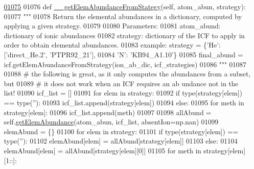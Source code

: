 \begin{DoxyCode}
\hypertarget{classpyneb_1_1core_1_1icf_1_1_i_c_f_l01075}{}\hyperlink{classpyneb_1_1core_1_1icf_1_1_i_c_f_adb36fd35be4adf2410376f184449fcdb}{01075} 
01076     \textcolor{keyword}{def }\hyperlink{classpyneb_1_1core_1_1icf_1_1_i_c_f_adb36fd35be4adf2410376f184449fcdb}{\_\_getElemAbundanceFromStategy}(self, atom\_abun, strategy):
01077         \textcolor{stringliteral}{"""}
01078 \textcolor{stringliteral}{        Return the elemental abundances in a dictionary, computed by applying a given strategy.}
01079 \textcolor{stringliteral}{        }
01080 \textcolor{stringliteral}{        Parameters:}
01081 \textcolor{stringliteral}{            atom\_abund: dictionary of ionic abundances}
01082 \textcolor{stringliteral}{            strategy: dictionary of the ICF to apply in order to obtain elemental abundances.}
01083 \textcolor{stringliteral}{                example: strategy = \{'He':['direct\_He.2', 'PTPR92\_21'], }
01084 \textcolor{stringliteral}{                                   'N': 'KB94\_A1.10'\}}
01085 \textcolor{stringliteral}{            final\_abund = icf.getElemAbundanceFromStrategy(ion\_ab\_dic, icf\_strategies)}
01086 \textcolor{stringliteral}{        """}
01087         
01088         \textcolor{comment}{# the following is great, as it only computes the abundances from a subset, but}
01089         \textcolor{comment}{# it does not work when an ICF requires an ab undance not in the list!}
01090         icf\_list = []
01091         \textcolor{keywordflow}{for} elem \textcolor{keywordflow}{in} strategy:
01092             \textcolor{keywordflow}{if} type(strategy[elem]) == type(\textcolor{stringliteral}{''}):
01093                 icf\_list.append(strategy[elem])
01094             \textcolor{keywordflow}{else}:
01095                 \textcolor{keywordflow}{for} meth \textcolor{keywordflow}{in} strategy[elem]:
01096                     icf\_list.append(meth)
01097                 
01098         allAbund = self.\hyperlink{classpyneb_1_1core_1_1icf_1_1_i_c_f_a30b52d6d1ec148fba7c0a15cad653f61}{getElemAbundance}(atom\_abun, icf\_list, absentIon=np.nan)
01099         elemAbund = \{\}
01100         \textcolor{keywordflow}{for} elem \textcolor{keywordflow}{in} strategy:
01101             \textcolor{keywordflow}{if} type(strategy[elem]) == type(\textcolor{stringliteral}{''}):
01102                 elemAbund[elem] = allAbund[strategy[elem]]
01103             \textcolor{keywordflow}{else}:
01104                 elemAbund[elem] = allAbund[strategy[elem][0]]
01105                 \textcolor{keywordflow}{for} meth \textcolor{keywordflow}{in} strategy[elem][1::]:

\end{DoxyCode}
